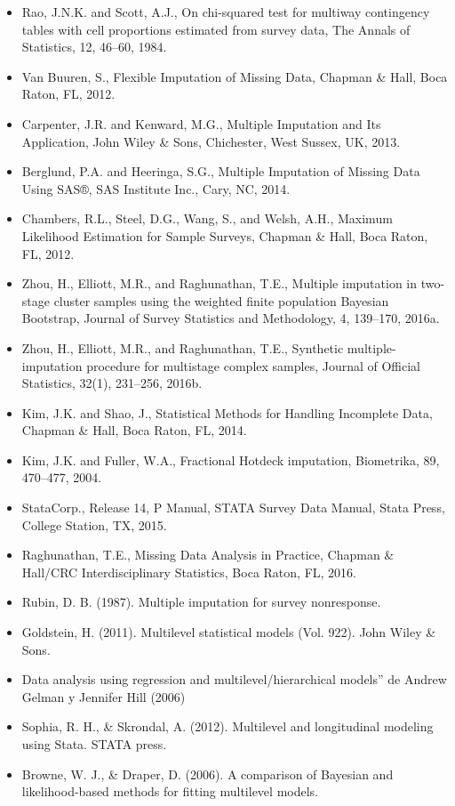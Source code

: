 \documentclass[
  spanish,
  12pt,
]{book}
\begin{document}
\begin{itemize}
\item
  Rao, J.N.K. and Scott, A.J., On chi-squared test for multiway contingency tables with cell proportions estimated from survey data, The Annals of Statistics, 12, 46--60, 1984.
\item
  Van Buuren, S., Flexible Imputation of Missing Data, Chapman \& Hall, Boca Raton, FL, 2012.
\item
  Carpenter, J.R. and Kenward, M.G., Multiple Imputation and Its Application, John Wiley \& Sons, Chichester, West Sussex, UK, 2013.
\item
  Berglund, P.A. and Heeringa, S.G., Multiple Imputation of Missing Data Using SAS®, SAS Institute Inc., Cary, NC, 2014.
\item
  Chambers, R.L., Steel, D.G., Wang, S., and Welsh, A.H., Maximum Likelihood Estimation for Sample Surveys, Chapman \& Hall, Boca Raton, FL, 2012.
\item
  Zhou, H., Elliott, M.R., and Raghunathan, T.E., Multiple imputation in two-stage cluster samples using the weighted finite population Bayesian Bootstrap, Journal of Survey Statistics and Methodology, 4, 139--170, 2016a.
\item
  Zhou, H., Elliott, M.R., and Raghunathan, T.E., Synthetic multiple-imputation procedure for multistage complex samples, Journal of Official Statistics, 32(1), 231--256, 2016b.
\item
  Kim, J.K. and Shao, J., Statistical Methods for Handling Incomplete Data, Chapman \& Hall, Boca Raton, FL, 2014.
\item
  Kim, J.K. and Fuller, W.A., Fractional Hotdeck imputation, Biometrika, 89, 470--477, 2004.
\item
  StataCorp., Release 14, P Manual, STATA Survey Data Manual, Stata Press, College Station, TX, 2015.
\item
  Raghunathan, T.E., Missing Data Analysis in Practice, Chapman \& Hall/CRC Interdisciplinary Statistics, Boca Raton, FL, 2016.
\item
  Rubin, D. B. (1987). Multiple imputation for survey nonresponse.
\item
  Goldstein, H. (2011). Multilevel statistical models (Vol. 922). John Wiley \& Sons.
\item
  Data analysis using regression and multilevel/hierarchical models'' de Andrew Gelman y Jennifer Hill (2006)
\item
  Sophia, R. H., \& Skrondal, A. (2012). Multilevel and longitudinal modeling using Stata. STATA press.
\item
  Browne, W. J., \& Draper, D. (2006). A comparison of Bayesian and likelihood-based methods for fitting multilevel models.
\end{itemize}
\end{document}
